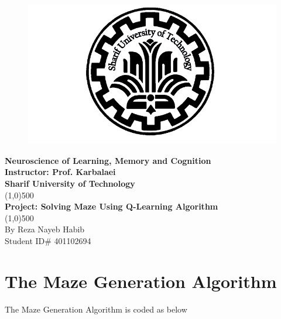 \documentclass[11pt]{article}
\begin{document}
 
\begin{titlepage}
\begin{center}

\begin{figure}[H]
\begin{center}
\includegraphics[scale=0.4]{Fig/SUT.png}

\end{center}
\end{figure}

\huge{\textbf{Neuroscience of Learning, Memory and Cognition}} \\ 
\vspace*{2cm}
\Large{\textbf{Instructor: Prof. Karbalaei}} \\
\vspace*{1cm}
\huge{\textbf{Sharif University of Technology}} \\
\line(1,0){500} \\ 
\Huge{\textbf{Project: Solving Maze Using Q-Learning Algorithm}} \\
\line(1,0){500} \\
\vfill
\Large{By Reza Nayeb Habib}\\
\Large{Student ID\# 401102694} \\

\end{center}
\end{titlepage}

\tableofcontents
\thispagestyle{empty}
\clearpage
\setcounter{page}{1}


\section{The Maze Generation Algorithm}
The Maze Generation Algorithm is coded as below
\end{document}
